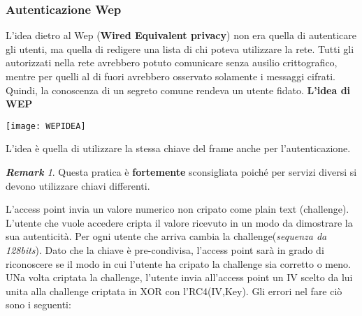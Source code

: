 \documentclass{article}
\theoremstyle{remark}
\newtheorem*{remark}{\textbf{Remark}}
\begin{document}
\subsubsection{Autenticazione Wep}
L'idea dietro al Wep (\textbf{Wired Equivalent privacy}) non era quella di autenticare gli utenti, ma quella di redigere una lista di chi poteva utilizzare la rete. Tutti gli autorizzati nella rete avrebbero potuto comunicare senza ausilio crittografico, mentre per quelli al di fuori avrebbero osservato solamente i messaggi cifrati. Quindi, la conoscenza di un segreto comune rendeva un utente fidato.
\textbf{L'idea di WEP}
\begin{center}
	\texttt{[image: WEPIDEA]}
\end{center}
L'idea è quella di utilizzare la stessa chiave del frame anche per l'autenticazione.
\begin{remark}
	Questa pratica è \textbf{fortemente} sconsigliata poiché per servizi diversi si devono utilizzare chiavi differenti.
\end{remark}
L'access point invia un valore numerico non cripato come plain text (challenge). L'utente che vuole accedere cripta il valore ricevuto in un modo da dimostrare la sua autenticità. Per ogni utente che arriva cambia la challenge(\emph{sequenza da 128bits}).\newline
Dato che la chiave è pre-condivisa, l'access point sarà in grado di riconoscere se il modo in cui l'utente ha cripato la challenge sia corretto o meno. UNa volta criptata la challenge, l'utente invia all'access point un IV scelto da lui unita alla challenge criptata in XOR con l'RC4(IV,Key).
Gli errori nel fare ciò sono i seguenti:
\end{document}
